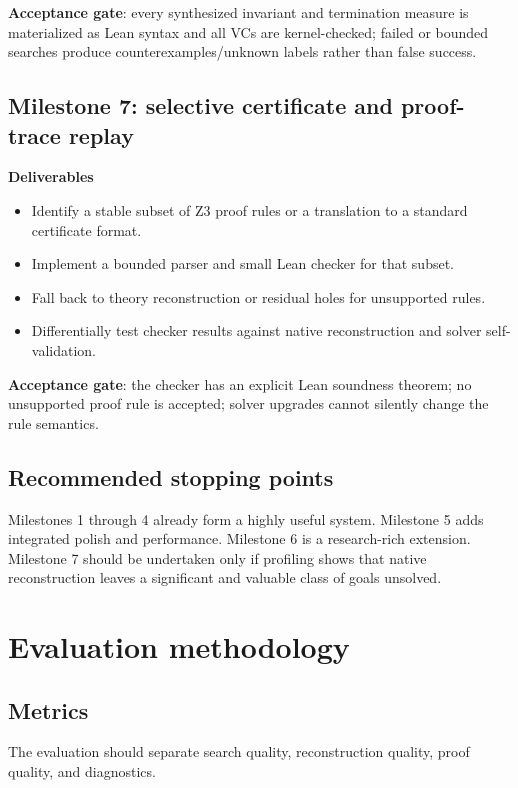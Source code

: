 \documentclass[11pt,letterpaper,openany]{report}
\begin{document}
\textbf{Acceptance gate}: every synthesized invariant and termination measure is
materialized as Lean syntax and all VCs are kernel-checked; failed or bounded searches
produce counterexamples/unknown labels rather than false success.

\section{Milestone 7: selective certificate and proof-trace replay}

\textbf{Deliverables}

\begin{itemize}
  \item Identify a stable subset of Z3 proof rules or a translation to a standard
        certificate format.
  \item Implement a bounded parser and small Lean checker for that subset.
  \item Fall back to theory reconstruction or residual holes for unsupported rules.
  \item Differentially test checker results against native reconstruction and solver
        self-validation.
\end{itemize}

\textbf{Acceptance gate}: the checker has an explicit Lean soundness theorem; no
unsupported proof rule is accepted; solver upgrades cannot silently change the rule
semantics.

\section{Recommended stopping points}

Milestones 1 through 4 already form a highly useful system. Milestone 5 adds integrated
polish and performance. Milestone 6 is a research-rich extension. Milestone 7 should be
undertaken only if profiling shows that native reconstruction leaves a significant and
valuable class of goals unsolved.

\chapter{Evaluation methodology}
\label{ch:evaluation}

\section{Metrics}

The evaluation should separate search quality, reconstruction quality, proof quality,
and diagnostics.
\end{document}
